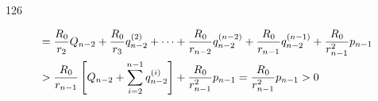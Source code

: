 \begin{solution}{126}
\begin{subsolution}
\begin{align}
            &= \frac {R _ {0}}{r _ {2}} Q _ {n - 2} + \frac {R _ {0}}{r _ {3}} q _ {n - 2} ^ {(2)} + \dots + \frac {R _ {0}}{r _ {n - 2}} q _ {n - 2} ^ {(n - 2)} + \frac {R _ {0}}{r _ {n - 1}} q _ {n - 2} ^ {(n - 1)} + \frac {R _ {0}}{r _ {n - 1} ^ {2}} p _ {n - 1} \notag \\
            &> \frac {R _ {0}}{r _ {n - 1}} \left[ Q _ {n - 2} + \sum_ {i = 2} ^ {n - 1} q _ {n - 2} ^ {(i)} \right] + \frac {R _ {0}}{r _ {n - 1} ^ {2}} p _ {n - 1} = \frac {R _ {0}}{r _ {n - 1} ^ {2}} p _ {n - 1} > 0
            \label{eq:39.s126}
        \end{align}
    \end{subsolution}
\end{solution}








